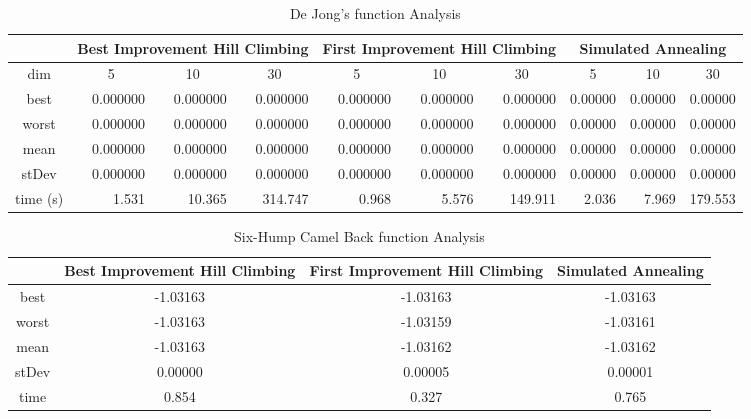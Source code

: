 \documentclass[a4paper]{article}
\begin{document}
\begin{table}[H]
	\centering
	\caption{De Jong's function Analysis}
	\begin{tabular}{|c|r|r|r|r|r|r|r|r|r|}
		\toprule
		& \multicolumn{3}{c|}{Best Improvement Hill Climbing} & \multicolumn{3}{c|}{First Improvement Hill Climbing} & \multicolumn{3}{c|}{Simulated Annealing} \\
		\midrule
		dim   & \multicolumn{1}{c|}{5} & \multicolumn{1}{c|}{10} & \multicolumn{1}{c|}{30} & \multicolumn{1}{c|}{5} & \multicolumn{1}{c|}{10} & \multicolumn{1}{c|}{30} & \multicolumn{1}{c|}{5} & \multicolumn{1}{c|}{10} & \multicolumn{1}{c|}{30} \\
		\midrule
		best  & 0.000000 & 0.000000 & 0.000000 & 0.000000 & 0.000000 & 0.000000 & 0.00000 & 0.00000 & 0.00000 \\
		\midrule
		worst & 0.000000 & 0.000000 & 0.000000 & 0.000000 & 0.000000 & 0.000000 & 0.00000 & 0.00000 & 0.00000 \\
		\midrule
		mean & 0.000000 & 0.000000 & 0.000000 & 0.000000 & 0.000000 & 0.000000 & 0.00000 & 0.00000 & 0.00000 \\
		\midrule
		stDev & 0.000000 & 0.000000 & 0.000000 & 0.000000 & 0.000000 & 0.000000 & 0.00000 & 0.00000 & 0.00000 \\
		\midrule
		time (s) & 1.531 & 10.365 & 314.747 & 0.968 & 5.576 & 149.911 & 2.036 & 7.969 & 179.553 \\
		\bottomrule
	\end{tabular}%
	\label{tab:addlabel}%
\end{table}%

\begin{table}[h]
	\centering
	\caption{Six-Hump Camel Back function Analysis}
	\begin{tabular}{|c|ccc|ccc|ccc|}
		\toprule
		& \multicolumn{3}{c|}{Best Improvement Hill Climbing} & \multicolumn{3}{c|}{First Improvement Hill Climbing} & \multicolumn{3}{c|}{Simulated Annealing} \\
		\midrule
		best  & \multicolumn{3}{c|}{-1.03163} & \multicolumn{3}{c|}{-1.03163} & \multicolumn{3}{c|}{-1.03163} \\
		\midrule
		worst & \multicolumn{3}{c|}{-1.03163} & \multicolumn{3}{c|}{-1.03159} & \multicolumn{3}{c|}{-1.03161} \\
		\midrule
		mean & \multicolumn{3}{c|}{-1.03163} & \multicolumn{3}{c|}{-1.03162} & \multicolumn{3}{c|}{-1.03162} \\
		\midrule
		stDev & \multicolumn{3}{c|}{0.00000} & \multicolumn{3}{c|}{0.00005} & \multicolumn{3}{c|}{0.00001} \\
		\midrule
		time  & \multicolumn{3}{c|}{0.854} & \multicolumn{3}{c|}{0.327} & \multicolumn{3}{c|}{0.765} \\
		\bottomrule
	\end{tabular}%
	\label{tab:addlabel}%
\end{table}%
\end{document}
